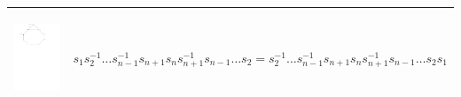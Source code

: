 \documentclass[11pt]{amsart}
\theoremstyle{definition}
\begin{document}
\begin{table}[h]
\begin{tabular}{| p{3.5cm} | p{7cm} |}
\begin{center}\includegraphics[scale = .30]{Diagram4.pdf}\end{center} & $s_{1}s_{2}^{-1} \dots s_{n-1}^{-1}s_{n+1}s_{n}s_{n+1}^{-1}s_{n-1} \dots s_{2} = s_{2}^{-1} \dots s_{n-1}^{-1}s_{n+1}s_{n}s_{n+1}^{-1}s_{n-1} \dots s_{2}s_{1}$ \\ \hline


\end{tabular}
\end{table}
\end{document}
